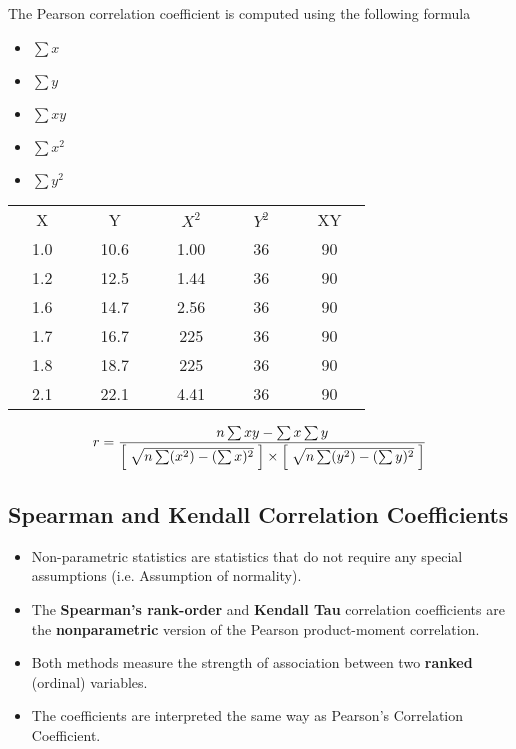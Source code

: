 \documentclass[]{report}
\begin{document}
The Pearson correlation coefficient is computed using the
following formula


\begin{itemize}
	\item $\sum x$ \item $\sum y$ \item $\sum xy$ \item $\sum x^2$
	\item $\sum y^2$
\end{itemize}

\begin{tabular}{|ccc|ccc|ccc|ccc|ccc|}
	\hline
	& X & & & Y & & &  $X^2$ & & &  $Y^2$ & & &  XY & \\
	& 1.0 & & & 10.6 & & &  1.00 & & &  36 & & &  90 & \\ \hline
	& 1.2 & & & 12.5 & & &  1.44 & & &  36 & & &  90 & \\ \hline
	& 1.6 & & & 14.7 & & &  2.56 & & &  36 & & &  90 & \\ \hline
	& 1.7 & & & 16.7 & & &  225 & & &  36 & & &  90 & \\ \hline
	& 1.8 & & & 18.7 & & &  225 & & &  36 & & &  90 & \\ \hline
	& 2.1 & & & 22.1 & & &  4.41 & & &  36 & & &  90 & \\ \hline
	
	
\end{tabular}

\[
r = { \; n \sum xy - \sum x \sum y   \; \over \left[\;\sqrt{n \sum (x^2) - (\sum x)^2} \;\right] \times  \left[ \;\sqrt{n \sum (y^2) - (\sum y)^2}\; \right]}
\]

\subsection*{Spearman and Kendall Correlation Coefficients}
\begin{itemize}
	\item Non-parametric statistics are statistics that do not require any special assumptions (i.e. Assumption of normality). 
	\item The \textbf{Spearman's rank-order} and \textbf{Kendall Tau} correlation coefficients are the \textbf{nonparametric} version of the Pearson product-moment correlation. 
	\item Both methods measure the strength of association between two \textbf{ranked} (ordinal) variables.
	\item  The coefficients are interpreted the same way as Pearson's Correlation Coefficient.
\end{itemize}
\end{document}
